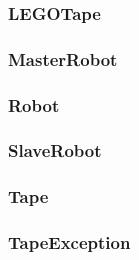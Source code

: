 \documentclass[%
  a4paper,%
  11pt,%
  blue,%
  hyperref	%
  ]{tubsartcl}
\begin{document}
\subsubsection{LEGOTape}

\subsubsection{MasterRobot}

\subsubsection{Robot}

\subsubsection{SlaveRobot}

\subsubsection{Tape}

\subsubsection{TapeException}


\makebackpage[trisec]%
\end{document}
